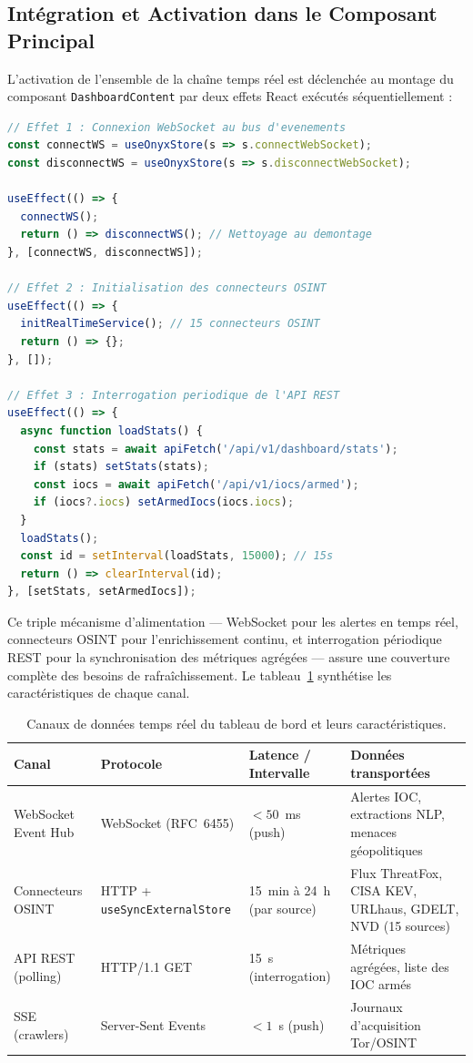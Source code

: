 \subsection{Intégration et Activation dans le Composant Principal}

L'activation de l'ensemble de la chaîne temps réel est déclenchée au montage du composant \texttt{DashboardContent} par deux effets React exécutés séquentiellement :

\begin{lstlisting}[language=JavaScript, caption={Montage du composant principal : activation du canal WebSocket et des connecteurs OSINT.}, label={lst:dashboard-mount}]
// Effet 1 : Connexion WebSocket au bus d'evenements
const connectWS = useOnyxStore(s => s.connectWebSocket);
const disconnectWS = useOnyxStore(s => s.disconnectWebSocket);

useEffect(() => {
  connectWS();
  return () => disconnectWS(); // Nettoyage au demontage
}, [connectWS, disconnectWS]);

// Effet 2 : Initialisation des connecteurs OSINT
useEffect(() => {
  initRealTimeService(); // 15 connecteurs OSINT
  return () => {};
}, []);

// Effet 3 : Interrogation periodique de l'API REST
useEffect(() => {
  async function loadStats() {
    const stats = await apiFetch('/api/v1/dashboard/stats');
    if (stats) setStats(stats);
    const iocs = await apiFetch('/api/v1/iocs/armed');
    if (iocs?.iocs) setArmedIocs(iocs.iocs);
  }
  loadStats();
  const id = setInterval(loadStats, 15000); // 15s
  return () => clearInterval(id);
}, [setStats, setArmedIocs]);
\end{lstlisting}

Ce triple mécanisme d'alimentation --- WebSocket pour les alertes en temps réel, connecteurs OSINT pour l'enrichissement continu, et interrogation périodique REST pour la synchronisation des métriques agrégées --- assure une couverture complète des besoins de rafraîchissement. Le tableau~\ref{tab:data-channels} synthétise les caractéristiques de chaque canal.

\begin{table}[H]
\centering
\caption{Canaux de données temps réel du tableau de bord et leurs caractéristiques.}
\label{tab:data-channels}
\begin{tabular}{|p{3.5cm}|p{2.5cm}|p{3.5cm}|p{4cm}|}
\hline
\textbf{Canal} & \textbf{Protocole} & \textbf{Latence / Intervalle} & \textbf{Données transportées} \\
\hline
WebSocket Event Hub & WebSocket (RFC~6455) & $< 50$~ms (push) & Alertes IOC, extractions NLP, menaces géopolitiques \\
\hline
Connecteurs OSINT & HTTP + \texttt{useSyncExternalStore} & 15~min à 24~h (par source) & Flux ThreatFox, CISA KEV, URLhaus, GDELT, NVD (15 sources) \\
\hline
API REST (polling) & HTTP/1.1 GET & 15~s (interrogation) & Métriques agrégées, liste des IOC armés \\
\hline
SSE (crawlers) & Server-Sent Events & $< 1$~s (push) & Journaux d'acquisition Tor/OSINT \\
\hline
\end{tabular}
\end{table}

